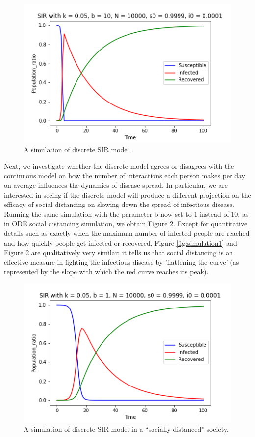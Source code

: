 \documentclass[12pt, reqno]{amsart}
\begin{document}
    \begin{figure}[h]
        \centering
        \includegraphics[scale=0.8]{sir_discrete_simulation0.png}
        \caption{A simulation of discrete SIR model.}
        \label{fig:discrete_simulation0}
    \end{figure}
    
    Next, we investigate whether the discrete model agrees or disagrees with the continuous model on how the number of interactions each person makes per day on average influences the dynamics of disease spread. In particular, we are interested in seeing if the discrete model will produce a different projection on the efficacy of social distancing on slowing down the spread of infectious disease. Running the same simulation with the parameter b now set to 1 instead of 10, as in ODE social distancing simulation, we obtain Figure \ref{fig:discrete_simulation1}. Except for quantitative details such as exactly when the maximum number of infected people are reached and how quickly people get infected or recovered, Figure  \ref{fig:simulation1} and Figure \ref{fig:discrete_simulation1} are qualitatively very similar; it tells us that social distancing is an effective measure in fighting the infectious disease by 'flattening the curve' (as represented by the slope with which the red curve reaches its peak).
    \begin{figure}[h]
        \centering
        \includegraphics[scale=0.8]{sir_discrete_simulation1.png}
        \caption{A simulation of discrete SIR model in a ``socially distanced'' society.}
        \label{fig:discrete_simulation1}
    \end{figure}
    
\end{document}
